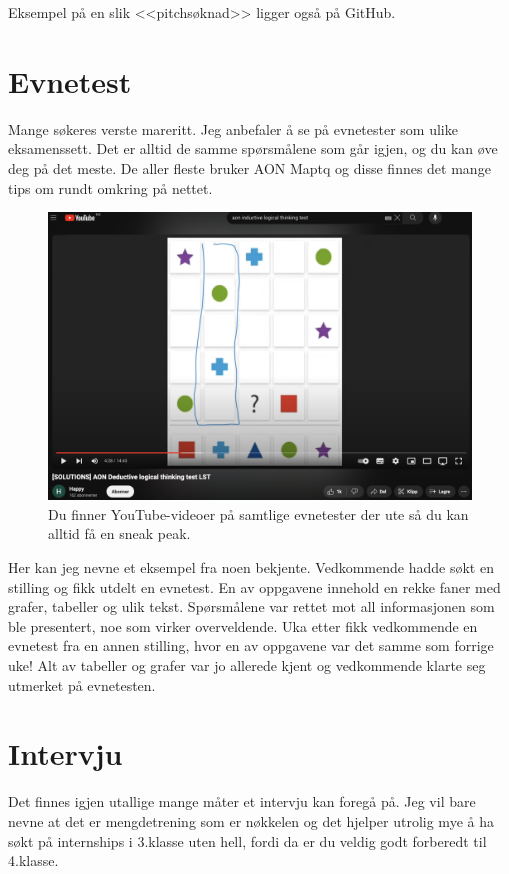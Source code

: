 Eksempel på en slik <<pitchsøknad>> ligger også på GitHub. 






\section{Evnetest}

Mange søkeres verste mareritt. Jeg anbefaler å se på evnetester som ulike eksamenssett. Det er alltid de samme spørsmålene som går igjen, og du kan øve deg på det meste. De aller fleste bruker AON Maptq og disse finnes det mange tips om rundt omkring på nettet.

\begin{figure}[H]
    \centering
    \includegraphics[width=0.8\linewidth]{images/aon.png}
    \caption{Du finner YouTube-videoer på samtlige evnetester der ute så du kan alltid få en sneak peak.}
\end{figure}

Her kan jeg nevne et eksempel fra noen bekjente. Vedkommende hadde søkt en stilling og fikk utdelt en evnetest. En av oppgavene innehold en rekke faner med grafer, tabeller og ulik tekst. Spørsmålene var rettet mot all informasjonen som ble presentert, noe som virker overveldende. Uka etter fikk vedkommende en evnetest fra en annen stilling, hvor en av oppgavene var det samme som forrige uke! Alt av tabeller og grafer var jo allerede kjent og vedkommende klarte seg utmerket på evnetesten. 



\section{Intervju}

Det finnes igjen utallige mange måter et intervju kan foregå på. Jeg vil bare nevne at det er mengdetrening som er nøkkelen og det hjelper utrolig mye å ha søkt på internships i 3.klasse uten hell, fordi da er du veldig godt forberedt til 4.klasse. 

